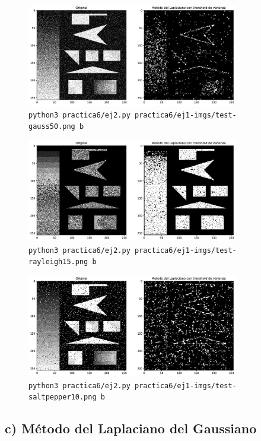 \documentclass[11pt, spanish]{article}
\begin{document}
\begin{figure}[H]
\centering
    \includegraphics[height=4.5cm]{informe-imgs/ej2-b-test-gauss50.jpg}
    \caption{\texttt{python3 practica6/ej2.py practica6/ej1-imgs/test-gauss50.png b}}
\end{figure}

\begin{figure}[H]
\centering
    \includegraphics[height=4.5cm]{informe-imgs/ej2-b-test-rayleigh15.jpg}
    \caption{\texttt{python3 practica6/ej2.py practica6/ej1-imgs/test-rayleigh15.png b}}
\end{figure}

\begin{figure}[H]
\centering
    \includegraphics[height=4.5cm]{informe-imgs/ej2-b-test-saltpepper10.jpg}
    \caption{\texttt{python3 practica6/ej2.py practica6/ej1-imgs/test-saltpepper10.png b}}
\end{figure}


\newpage
\subsection{c) Método del Laplaciano del Gaussiano}
\end{document}

